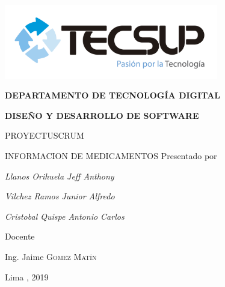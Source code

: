 \begin{titlepage}
	\centering
	\includegraphics[width=0.70\textwidth]{img/logo_tecsup_final}\par\vspace{1cm}
	\vspace{0.30cm}	
	{\scshape\large\bfseries DEPARTAMENTO DE TECNOLOG\'IA DIGITAL \par}
	\vspace{0.60cm}	
	{\scshape\large\bfseries DISEÑO Y DESARROLLO DE SOFTWARE  \par}
	\vspace{2.00cm}		
	{\large\large  PROYECTUSCRUM \par}
	\vspace{0.60cm}
	{\scshape\large INFORMACION DE MEDICAMENTOS }
	\vspace{0.60cm}
	\vfill
	Presentado por \par
	{\large\itshape { Llanos Orihuela Jeff Anthony }\par}
	{\large\itshape { Vilchez Ramos Junior Alfredo}\par}
	{\large\itshape { Cristobal Quispe Antonio Carlos}\par}
	\vspace{0.30cm}
	\vfill
	Docente \par
	Ing. Jaime  \textsc{Gomez Matín}
	
  \vspace{0.30cm}
	\vfill
        {\large Lima , 2019 \par}
\end{titlepage}

